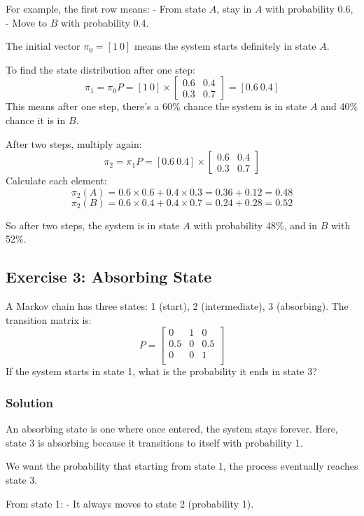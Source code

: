 \documentclass{book}
\begin{document}
For example, the first row means:
- From state $A$, stay in $A$ with probability 0.6,
- Move to $B$ with probability 0.4.

The initial vector $\pi_0 = [1\ 0]$ means the system starts definitely in state $A$.

To find the state distribution after one step:
\[
\pi_1 = \pi_0 P = [1\ 0] \times \begin{bmatrix}0.6 & 0.4 \\ 0.3 & 0.7\end{bmatrix} = [0.6\ 0.4]
\]
This means after one step, there's a 60\% chance the system is in state $A$ and 40\% chance it is in $B$.

After two steps, multiply again:
\[
\pi_2 = \pi_1 P = [0.6\ 0.4] \times \begin{bmatrix}0.6 & 0.4 \\ 0.3 & 0.7\end{bmatrix}
\]
Calculate each element:
\[
\pi_2(A) = 0.6 \times 0.6 + 0.4 \times 0.3 = 0.36 + 0.12 = 0.48
\]
\[
\pi_2(B) = 0.6 \times 0.4 + 0.4 \times 0.7 = 0.24 + 0.28 = 0.52
\]

So after two steps, the system is in state $A$ with probability 48\%, and in $B$ with 52\%.

\subsection*{Exercise 3: Absorbing State}
A Markov chain has three states: 1 (start), 2 (intermediate), 3 (absorbing). The transition matrix is:
\[
P = \begin{bmatrix}
0 & 1 & 0 \\
0.5 & 0 & 0.5 \\
0 & 0 & 1 \\
\end{bmatrix}
\]
If the system starts in state 1, what is the probability it ends in state 3?

\subsubsection*{Solution}
An absorbing state is one where once entered, the system stays forever. Here, state 3 is absorbing because it transitions to itself with probability 1.

We want the probability that starting from state 1, the process eventually reaches state 3.

From state 1:
- It always moves to state 2 (probability 1).
\end{document}
